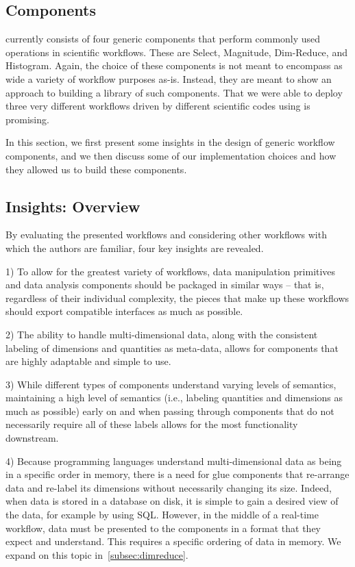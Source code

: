 \subsection{Components}

\sys currently consists of four generic components
that perform commonly used operations
in scientific workflows. These are Select,
Magnitude, Dim-Reduce, and Histogram.
Again, the choice of these components
is not meant to encompass as wide a variety
of workflow purposes as-is.
Instead, they are meant to show an approach
to building a library of such components.
That we were able to deploy three
very different workflows driven by different
scientific codes using \sys is promising.





In this section, we first present
some insights in the design of
generic workflow components,
and we then discuss
some of our implementation choices
and how they allowed us to 
build these components.

\subsection{Insights: Overview}

By evaluating the presented workflows
and considering other workflows with
which the authors are familiar,
four key insights are revealed.

1) To allow for the greatest variety of workflows,
data manipulation primitives and data analysis components
should be packaged in similar ways -- that is,
regardless of their individual complexity,
the pieces that make up these workflows
should export compatible interfaces as much as possible.

2) The ability to handle multi-dimensional data,
along with the consistent labeling of
dimensions and quantities as meta-data,
allows for components that are highly
adaptable and simple to use.

3) While different types of components understand
varying levels of semantics, maintaining a
high level of semantics (i.e., labeling
quantities and dimensions as much
as possible) early on and when passing
through components that do not necessarily
require all of these labels allows for the most
functionality downstream.

4) Because programming languages understand
multi-dimensional data as being in a
specific order in memory, there is a need for
glue components that re-arrange data and
re-label its dimensions without necessarily
changing its size. Indeed, when data is stored
in a database on disk, it is simple to gain a desired
view of the data, for example by using SQL.
However, in the middle of a real-time workflow,
data must be presented to the components in a
format that they expect and understand.
This requires a specific ordering of data in
memory. We expand on this topic in~\autoref{subsec:dimreduce}.

